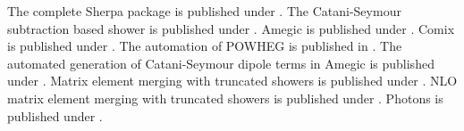 \documentclass{article}
\begin{document}
The complete Sherpa package is published under \cite{Gleisberg:2008ta}.
The Catani-Seymour subtraction based shower is published under \cite{Schumann:2007mg}.
Amegic is published under \cite{Krauss:2001iv}.
Comix is published under \cite{Gleisberg:2008fv}.
The automation of POWHEG is published in \cite{Hoeche:2010pf}.
The automated generation of Catani-Seymour dipole terms in Amegic is published under \cite{Gleisberg:2007md}.
Matrix element merging with truncated showers is published under \cite{Hoeche:2009rj}.
NLO matrix element merging with truncated showers is published under \cite{Hoeche:2010kg}.
Photons is published under \cite{Schonherr:2008av}.
\end{document}

